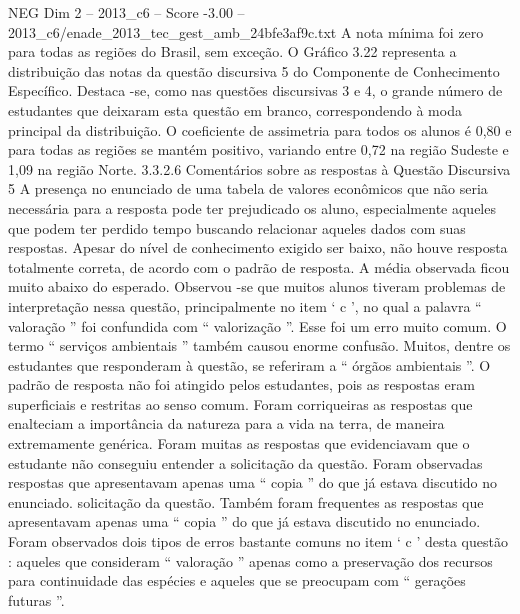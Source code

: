 \begin{textsample}{NEG Dim 2 – 2013\_c6 – Score -3.00 – 2013\_c6/enade\_2013\_tec\_gest\_amb\_24bfe3af9c.txt}
A nota mínima foi zero para todas as regiões do Brasil, sem exceção.
O Gráfico 3.22 representa a distribuição das notas da questão discursiva 5 do Componente de Conhecimento Específico.
Destaca -se, como nas questões discursivas 3 e 4, o grande número de estudantes que deixaram esta questão em branco, correspondendo à moda principal da distribuição.
O coeficiente de assimetria para todos os alunos é 0,80 e para todas as regiões se mantém positivo, variando entre 0,72 na região Sudeste e 1,09 na região Norte. 3.3.2.6 Comentários sobre as respostas à Questão Discursiva 5 A presença no enunciado de uma tabela de valores econômicos que não seria necessária para a resposta pode ter prejudicado os aluno, especialmente aqueles que podem ter perdido tempo buscando relacionar aqueles dados com suas respostas.
Apesar do nível de conhecimento exigido ser baixo, não houve resposta totalmente correta, de acordo com o padrão de resposta.
A média observada ficou muito abaixo do esperado.
Observou -se que muitos alunos tiveram problemas de interpretação nessa questão, principalmente no item ‘ c ’, no qual a palavra “ valoração ” foi confundida com “ valorização ”.
Esse foi um erro muito comum.
O termo “ serviços ambientais ” também causou enorme confusão.
Muitos, dentre os estudantes que responderam à questão, se referiram a “ órgãos ambientais ”.
O padrão de resposta não foi atingido pelos estudantes, pois as respostas eram superficiais e restritas ao senso comum.
Foram corriqueiras as respostas que enalteciam a importância da natureza para a vida na terra, de maneira extremamente genérica.
Foram muitas as respostas que evidenciavam que o estudante não conseguiu entender a solicitação da questão.
Foram observadas respostas que apresentavam apenas uma “ copia ” do que já estava discutido no enunciado. solicitação da questão.
Também foram frequentes as respostas que apresentavam apenas uma “ copia ” do que já estava discutido no enunciado.
Foram observados dois tipos de erros bastante comuns no item ‘ c ’ desta questão : aqueles que consideram “ valoração ” apenas como a preservação dos recursos para continuidade das espécies e aqueles que se preocupam com “ gerações futuras ”.

\end{textsample}
